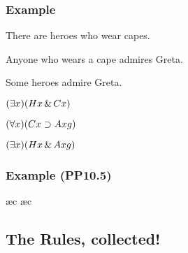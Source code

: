 \begin{frame}
\frametitle{Example}

\begin{earg}
  \item[] There are heroes who wear capes.
  \item[] Anyone who wears a cape admires Greta.
  \item[\therefore] Some heroes admire Greta.
\end{earg}
\bigskip
\begin{earg}
  \item[] $(\exists x)(Hx \,\&\, Cx)$
  \item[] $(\forall x)(Cx \supset Axg)$
  \item[\therefore] $(\exists x)(Hx \,\&\, Axg)$
\end{earg}
\end{frame}

\begin{frame}
\frametitle{Example (PP10.5)}
\footnotesize
\begin{fitchproof}
   \pr{}
   \pr{}
  \open
   
  \ae{c}
  \ae{c}
  \close
\end{fitchproof}
\end{frame}

\subsection{The Rules, collected!}

